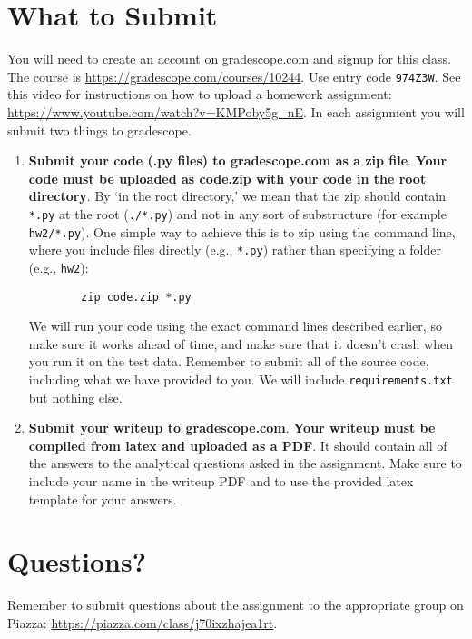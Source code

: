 \documentclass[11pt]{article}
\begin{document}
\section{What to Submit}
	You will need to create an account on gradescope.com and signup for this class. The course is \href{https://gradescope.com/courses/10244}{\url{https://gradescope.com/courses/10244}}. Use entry code {\tt 974Z3W}. See this video for instructions on how to upload a homework assignment: \href{https://www.youtube.com/watch?v=KMPoby5g_nE}{\url{https://www.youtube.com/watch?v=KMPoby5g_nE}}. In each assignment you will submit two things to gradescope.
	\begin{enumerate}
		\item \textbf{Submit your code (.py files) to gradescope.com as a zip file}. \textbf{Your code must be uploaded as code.zip with your code in the root directory}. By `in the root directory,' we mean that the zip should contain \texttt{*.py} at the root (\texttt{./*.py}) and not in any sort of substructure (for example \texttt{hw2/*.py}). One simple way to achieve this is to zip using the command line, where you include files directly (e.g., \texttt{*.py}) rather than specifying a folder (e.g., \texttt{hw2}):
		\begin{verbatim}
		zip code.zip *.py
		\end{verbatim}
		
		We will run your code using the exact command lines described earlier, so make sure it works ahead of time, and make sure that it doesn't crash when you run it on the test data. Remember to submit all of the source code, including what we have provided to you. We will include {\tt requirements.txt} but nothing else.
		\item \textbf{Submit your writeup to gradescope.com}. \textbf{Your writeup must be compiled from latex and uploaded as a PDF}. It should contain all of the answers to the analytical questions asked in the assignment. Make sure to include your name in the writeup PDF and to use the provided latex template for your answers. 
	\end{enumerate}
	
	\section{Questions?}
	Remember to submit questions about the assignment to the appropriate group on Piazza: \href{https://piazza.com/class/j70ixzhajea1rt}{\url{https://piazza.com/class/j70ixzhajea1rt}}.
\end{document}
